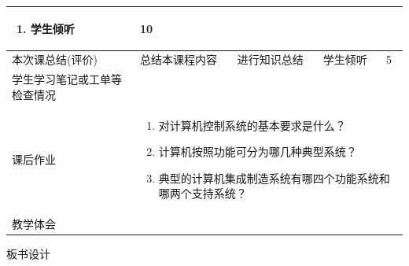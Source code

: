 {\begin{landscape}
\begin{longtable}{|m{10mm}|m{50mm}|m{50mm}|m{50mm}|m{15mm}|}
\begin{enumerate}
\item 学生倾听
\end{enumerate} &10 \\\hline
\centering 本次课总结(评价)&总结本课程内容 &进行知识总结 &学生倾听 &5 \\\hline
\centering 学生学习笔记或工单等检查情况&\multicolumn{4}{m{165mm}|}{\quad}\\\hline
\centering 课后作业&\multicolumn{4}{m{165mm}|}{\begin{enumerate}
\item 对计算机控制系统的基本要求是什么？
\item 计算机按照功能可分为哪几种典型系统？
\item 典型的计算机集成制造系统有哪四个功能系统和哪两个支持系统？
\end{enumerate}}\\\hline
\centering 教学体会&\multicolumn{4}{m{165mm}|}{\quad}\\
\end{longtable}

\end{landscape}
\clearpage
\begin{center}
{\huge 板书设计}
\end{center}
}

